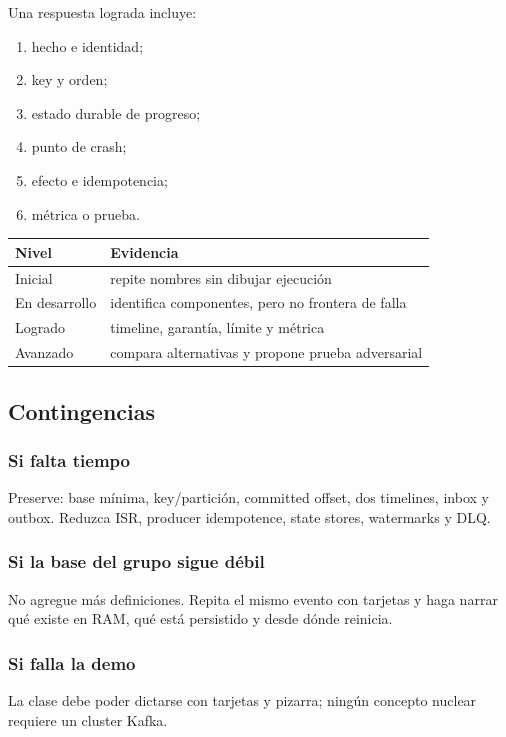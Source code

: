 \documentclass[variant=docente,cover=institutional,mode=screen]{ua-engineering-v6-article}
\begin{document}
Una respuesta lograda incluye:
\begin{enumerate}
\item hecho e identidad;
\item key y orden;
\item estado durable de progreso;
\item punto de crash;
\item efecto e idempotencia;
\item métrica o prueba.
\end{enumerate}

\begin{center}
\begin{tabular}{p{}p{}}
\toprule
Nivel & Evidencia \\
\midrule
Inicial & repite nombres sin dibujar ejecución \\
En desarrollo & identifica componentes, pero no frontera de falla \\
Logrado & timeline, garantía, límite y métrica \\
Avanzado & compara alternativas y propone prueba adversarial \\
\bottomrule
\end{tabular}
\end{center}

\subsection{Contingencias}

\subsubsection*{Si falta tiempo}
Preserve: base mínima, key/partición, committed offset, dos timelines, inbox y outbox. Reduzca ISR, producer idempotence, state stores, watermarks y DLQ.

\subsubsection*{Si la base del grupo sigue débil}
No agregue más definiciones. Repita el mismo evento con tarjetas y haga narrar qué existe en RAM, qué está persistido y desde dónde reinicia.

\subsubsection*{Si falla la demo}
La clase debe poder dictarse con tarjetas y pizarra; ningún concepto nuclear requiere un cluster Kafka.
\end{document}
